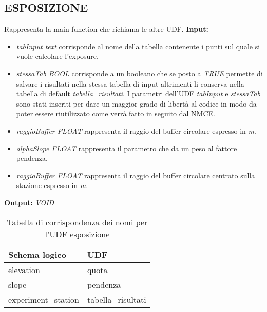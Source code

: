 \subsection{\textbf{ESPOSIZIONE}}
Rappresenta la main function che richiama le altre UDF.
\textbf{Input:}
\begin{itemize}
\item \textit{tabInput text} corrisponde al nome della tabella contenente i punti sul quale si vuole calcolare l'exposure. 
\item \textit{stessaTab BOOL} corrisponde a un booleano che se posto a \textit{TRUE} permette di salvare i risultati nella stessa tabella di input altrimenti li conserva nella tabella di default \textit{tabella\_risultati}. I parametri dell'UDF \textit{tabInput} e \textit{stessaTab} sono stati inseriti per dare un maggior grado di libertà al codice in modo da poter essere riutilizzato come verrà fatto in seguito dal NMCE. 
\item \textit{raggioBuffer FLOAT} rappresenta il raggio del buffer circolare espresso in \textit{m}.
\item \textit{alphaSlope FLOAT} rappresenta il parametro che da un peso al fattore pendenza.
\item \textit{raggioBuffer FLOAT } rappresenta il raggio del buffer circolare centrato sulla stazione espresso in \textit{m}.
\end{itemize}
\textbf{Output:} \textit{VOID} 

\begin{table}[h]
\centering
\caption{Tabella di corrispondenza dei nomi per l'UDF esposizione}
\label{mapTb3}
\begin{tabular}{|l|l|}
\hline
Schema logico       & UDF                \\ \hline
elevation           & quota              \\
slope               & pendenza           \\
experiment\_station & tabella\_risultati \\ \hline
\end{tabular}
\end{table}

